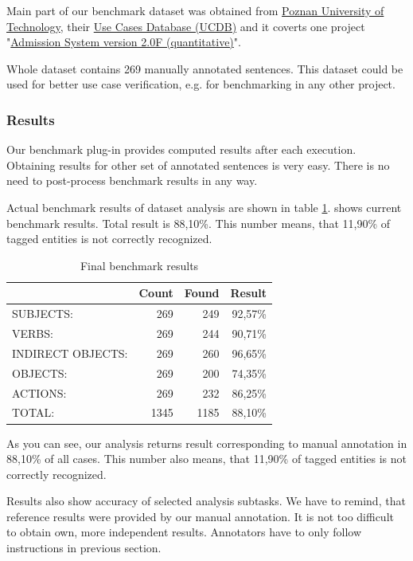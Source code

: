 Main part of our benchmark dataset was obtained from \href{http://www2.put.poznan.pl/en}{Poznan University of Technology}, their \href{http://www.se.cs.put.poznan.pl/knowledge-base/software-projects-database/use-cases-database-ucdb/use-cases-database-ucdb}{Use Cases Database (UCDB)} and it coverts one project "\href{http://ucdb.cs.put.poznan.pl/benchmark/2.f.n/srs/index.html}{Admission System version 2.0F (quantitative)}".  

Whole dataset contains 269 manually annotated sentences. This dataset could be used for better use case verification, e.g. for benchmarking in any other project.   

\subsubsection{Results}
Our benchmark plug-in provides computed results after each execution. Obtaining results for other set of annotated sentences is very easy. There is no need to post-process benchmark results in any way.

Actual benchmark results of dataset analysis are shown in table \ref{tab.benchmarkresults}. shows current benchmark results. Total result is 88,10\%. This number means, that 11,90\% of tagged entities is not correctly recognized.

\begin{table}[ht]   %
\begin{center}
\begin{tabular}{l r r r}
 & Count & Found & Result \\
\hline
SUBJECTS: & 269 & 249 & 92,57\% \\
VERBS: & 269 & 244 & 90,71\% \\
INDIRECT OBJECTS:& 269 & 260 & 96,65\% \\   
OBJECTS: & 269 & 200 & 74,35\% \\
ACTIONS: & 269 & 232 & 86,25\% \\
\hline
TOTAL: & 1345 & 1185 & 88,10\% \\
\hline
\end{tabular}

  \caption{Final benchmark results}
  \label{tab.benchmarkresults}
\end{center}
\end{table}    
 
As you can see, our analysis returns result corresponding to manual annotation in 88,10\% of all cases. This number also means, that 11,90\% of tagged entities is not correctly recognized.

Results also show accuracy of selected analysis subtasks. We have to remind, that reference results were provided by our manual annotation. It is not too difficult to obtain own, more independent results. Annotators have to only follow instructions in previous section.

